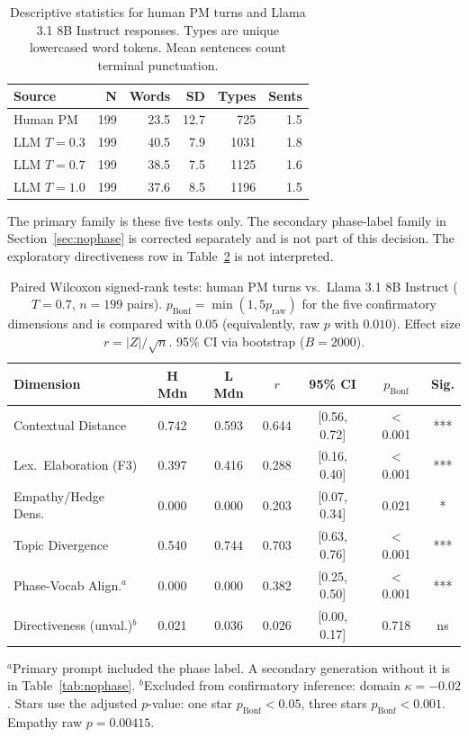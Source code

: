 \documentclass[10pt,journal,compsoc]{IEEEtran}
\begin{document}
\begin{table}[htbp]
\caption{Descriptive statistics for human PM turns and Llama 3.1 8B Instruct responses. Types are unique lowercased word tokens. Mean sentences count terminal punctuation.}
\label{tab:descriptive}
\centering
\small
\begin{tabular}{lrrrrr}
\toprule
\textbf{Source} & \textbf{N} & \textbf{Words} & \textbf{SD} & \textbf{Types} & \textbf{Sents} \\
\midrule
Human PM & 199 & 23.5 & 12.7 &  725 & 1.5 \\
LLM $T\!=\!0.3$ & 199 & 40.5 &  7.9 & 1031 & 1.8 \\
LLM $T\!=\!0.7$ & 199 & 38.5 &  7.5 & 1125 & 1.6 \\
LLM $T\!=\!1.0$ & 199 & 37.6 &  8.5 & 1196 & 1.5 \\
\bottomrule
\end{tabular}
\end{table}

The primary family is these five tests only. The secondary phase-label family in Section~\ref{sec:nophase} is corrected separately and is not part of this decision. The exploratory directiveness row in Table~\ref{tab:main_results} is not interpreted.

\begin{table}[htbp]
\caption{Paired Wilcoxon signed-rank tests: human PM turns vs.\ Llama 3.1 8B Instruct ($T = 0.7$, $n = 199$ pairs). $p_{\text{Bonf}} = \min(1, 5p_{\text{raw}})$ for the five confirmatory dimensions and is compared with $0.05$ (equivalently, raw $p$ with $0.010$). Effect size $r = |Z|/\sqrt{n}$. 95\% CI via bootstrap ($B = 2000$).}
\label{tab:main_results}
\centering
\small
\begin{tabular}{@{}lcccccc@{}}
\toprule
\textbf{Dimension} & \textbf{H Mdn} & \textbf{L Mdn} & \textbf{$r$} & \textbf{95\% CI} & \textbf{$p_{\text{Bonf}}$} & \textbf{Sig.} \\
\midrule
Contextual Distance   & 0.742 & 0.593 & 0.644 & [0.56, 0.72] & $<$0.001 & *** \\
Lex.\ Elaboration (F3)& 0.397 & 0.416 & 0.288 & [0.16, 0.40] & $<$0.001 & *** \\
Empathy/Hedge Dens. & 0.000 & 0.000 & 0.203 & [0.07, 0.34] & 0.021    & *   \\
Topic Divergence      & 0.540 & 0.744 & 0.703 & [0.63, 0.76] & $<$0.001 & *** \\
Phase-Vocab Align.$^a$& 0.000 & 0.000 & 0.382 & [0.25, 0.50] & $<$0.001 & *** \\
\midrule
Directiveness (unval.)$^b$ & 0.021 & 0.036 & 0.026 & [0.00, 0.17] & 0.718 & ns \\
\bottomrule
\end{tabular}
\vspace{2pt}
{\small $^a$Primary prompt included the phase label. A secondary generation without it is in Table~\ref{tab:nophase}. $^b$Excluded from confirmatory inference: domain $\kappa=-0.02$. Stars use the adjusted $p$-value: one star $p_{\text{Bonf}}<0.05$, three stars $p_{\text{Bonf}}<0.001$. Empathy raw $p=0.00415$.}
\end{table}
\end{document}
